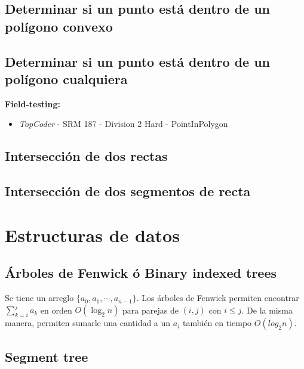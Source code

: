 \documentclass[10pt,letterpaper,twocolumn,twosided]{article}
\newcommand{\codigofuente}[1]{

\dotfill
}
\begin{document}
\subsection{Determinar si un punto está dentro de un polígono convexo}
\codigofuente{./src/geometria/is_inside_convex_polygon.cpp}

\subsection{Determinar si un punto está dentro de un polígono cualquiera}
\small
\textbf{Field-testing:}
\begin{itemize}
\item \emph{TopCoder} -  SRM 187 - Division 2 Hard - PointInPolygon
\end{itemize}
\codigofuente{./src/geometria/is_inside_concave_polygon.cpp}

\subsection{Intersección de dos rectas}
\codigofuente{./src/geometria/line_line_intersection.cpp}

\subsection{Intersección de dos segmentos de recta}
\codigofuente{./src/geometria/segment_segment_intersection.cpp}
\section{Estructuras de datos}
\subsection{Árboles de Fenwick ó Binary indexed trees}

Se tiene un arreglo $\{a_0, a_1, \cdots, a_{n-1}\}$. Los árboles
de Fenwick permiten encontrar $ \displaystyle \sum_{k=i}^{j} a_k $ en orden $O(\log_{2}{n})$ para parejas de $(i, j)$ con $i \leq j$. De la misma manera, permiten sumarle una cantidad a un $a_i$ también en tiempo $O(log_{2}{n})$.
\medskip
\codigofuente{./src/estructuras/fenwick.cpp}

\subsection{Segment tree}
\codigofuente{./src/estructuras/segment_tree.cpp}
\end{document}
